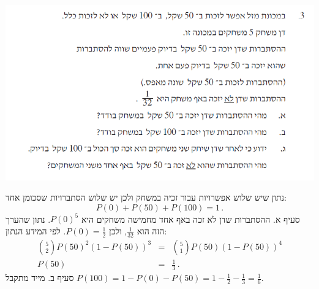 \documentclass[12pt,a4paper]{article}
\begin{document}
\begin{center}
\includegraphics[width=.95\textwidth]{winter-2016-3}
\end{center}
נתון שיש שלוש אפשרויות עבור זכיה במשחק ולכן יש שלוש הסתברויות שסכומן אחד:
\[
P(0) + P(50) + P(100) = 1\,.
\]
סעיף א. ההסתברות שדן לא זכה באף אחד מחמישה משחקים היא 
$P(0)^5$.
נתון שהערך הזה הוא 
$\frac{1}{32}$,
ולכן 
$P(0)=\frac{1}{2}$.
לפי המידע הנתון:
\begin{eqnarray*}
{5\choose 2} P(50)^2 (1-P(50))^3 &=& {5\choose 1} P(50) (1-P(50))^4\\
P(50)&=&\frac{1}{3}\,.
\end{eqnarray*}
סעיף ב. מייד מתקבל
$P(100) = 1 - P(0) - P(50) = 1-\frac{1}{2}-\frac{1}{3}=\frac{1}{6}$.
\end{document}
